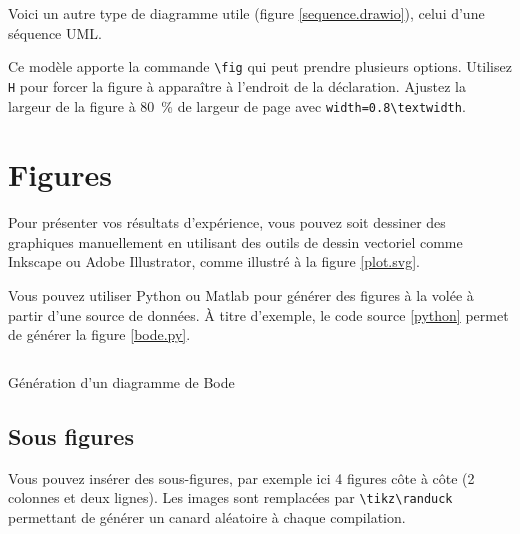 Voici un autre type de diagramme utile (figure \ref{sequence.drawio}), celui d'une séquence UML.


Ce modèle apporte la commande \verb!\fig! qui peut prendre plusieurs options. Utilisez \verb!H! pour forcer la figure à apparaître à l'endroit de la déclaration. Ajustez la largeur de la figure à \SI{80}{\percent} de largeur de page avec \verb!width=0.8\textwidth!.

\section{Figures}

Pour présenter vos résultats d'expérience, vous pouvez soit dessiner des graphiques manuellement en utilisant des outils de dessin vectoriel comme Inkscape ou Adobe Illustrator, comme illustré à la figure \ref{plot.svg}.


Vous pouvez utiliser Python ou Matlab pour générer des figures à la volée à partir d'une source de données. À titre d'exemple, le code source \ref{python} permet de générer la figure \ref{bode.py}.
\begin{listing}[ht]
    \inputminted{python}{assets/figures/bode.py}
    \caption{Génération d'un diagramme de Bode \label{python}}
\end{listing}


\subsection{Sous figures}

Vous pouvez insérer des sous-figures, par exemple ici 4 figures côte à côte (2 colonnes et deux lignes). Les images sont remplacées par \verb!\tikz\randuck! permettant de générer un canard aléatoire à chaque compilation.

